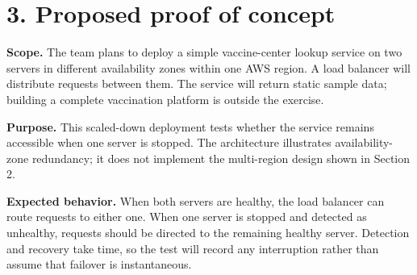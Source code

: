 \documentclass[11pt,a4paper]{article}
\newcommand{\sectionline}[1]{\section*{\color{navy}#1}}
\begin{document}
\newpage
\sectionline{3. Proposed proof of concept}
\textbf{Scope.} The team plans to deploy a simple vaccine-center lookup service on two servers in different availability zones within one AWS region. A load balancer will distribute requests between them. The service will return static sample data; building a complete vaccination platform is outside the exercise.
\begin{center}
\end{center}
\textbf{Purpose.} This scaled-down deployment tests whether the service remains accessible when one server is stopped. The architecture illustrates availability-zone redundancy; it does not implement the multi-region design shown in Section 2.

\textbf{Expected behavior.} When both servers are healthy, the load balancer can route requests to either one. When one server is stopped and detected as unhealthy, requests should be directed to the remaining healthy server. Detection and recovery take time, so the test will record any interruption rather than assume that failover is instantaneous.
\end{document}
